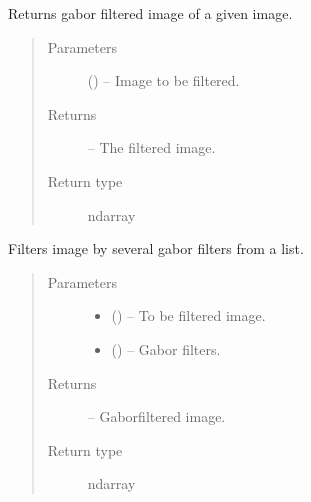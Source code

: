 \documentclass[letterpaper,10pt,english]{sphinxmanual}
\begin{document}

\begin{fulllineitems}
\label{\detokenize{image_gabor:image_gabor.get_gabor}}
Returns gabor filtered image of a given image.
\begin{quote}\begin{description}
\item[{Parameters}] \leavevmode
{} () -- Image to be filtered.

\item[{Returns}] \leavevmode
{} -- The filtered image.

\item[{Return type}] \leavevmode
ndarray

\end{description}\end{quote}

\end{fulllineitems}


\begin{fulllineitems}
\label{\detokenize{image_gabor:image_gabor.process}}
Filters image by several gabor filters from a list.
\begin{quote}\begin{description}
\item[{Parameters}] \leavevmode\begin{itemize}
\item {} 
 () -- To be filtered image.

\item {} 
 () -- Gabor filters.

\end{itemize}

\item[{Returns}] \leavevmode
{} -- Gaborfiltered image.

\item[{Return type}] \leavevmode
ndarray

\end{description}\end{quote}

\end{fulllineitems}
\end{document}
